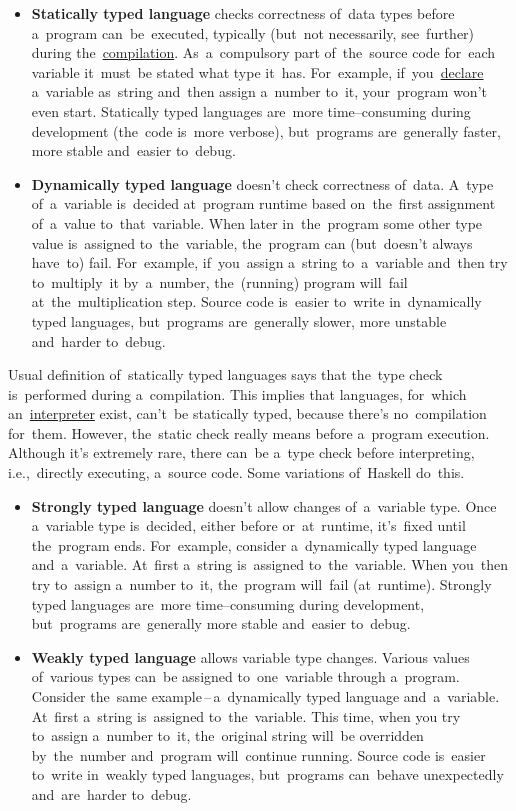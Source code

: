 \begin{itemize}
    \item \textbf{Statically typed language} checks correctness of~data types before a~program can~be~executed, typically (but~not necessarily, see~further) during the~\hyperref[compiledinterpretedlanguages]{compilation}. As~a~compulsory part of~the~source code for~each variable it~must~be stated what type it~has. For~example, if~you~\hyperref[declarationdefinition]{declare} a~variable as~string and~then assign a~number to~it, your~program won't even start. Statically typed languages are~more time--consuming during development (the~code is~more verbose), but~programs are~generally faster, more stable and~easier to~debug.
    \item \textbf{Dynamically typed language} doesn't check correctness of~data. A~type of~a~variable is~decided at~program runtime based on~the~first assignment of~a~value to~that~variable. When later in~the~program some other type value is~assigned to~the~variable, the~program can (but~doesn't always have~to) fail. For~example, if~you~assign a~string to~a~variable and~then try to~multiply~it by~a~number, the~(running) program will~fail at~the~multiplication step. Source code is~easier to~write in~dynamically typed languages, but~programs are~generally slower, more unstable and~harder to~debug.
\end{itemize}

\warning Usual definition of~statically typed languages says that the~type check is~performed during a~compilation. This implies that languages, for~which an~\hyperref[compiledinterpretedlanguages]{interpreter} exist, can't~be statically typed, because there's no~compilation for~them. However, the~static check really means before a~program execution. Although it's extremely rare, there can~be a~type check before interpreting, i.e.,~directly executing, a~source code. Some variations of~Haskell do~this.

\begin{itemize}
    \item \textbf{Strongly typed language} doesn't allow changes of~a~variable type. Once a~variable type is~decided, either before or~at~runtime, it's~fixed until the~program ends. For~example, consider a~dynamically typed language and~a~variable. At~first a~string is~assigned to~the~variable. When you~then try to~assign a~number to~it, the~program will~fail (at~runtime). Strongly typed languages are~more time--consuming during development, but~programs are~generally more stable and~easier to~debug.
    \item \textbf{Weakly typed language} allows variable type changes. Various values of~various types can~be assigned to~one~variable through a~program. Consider the~same example\,--\,a~dynamically typed language and~a~variable. At~first a~string is~assigned to~the~variable. This time, when you try to~assign a~number to~it, the~original string will~be overridden by~the~number and~program will~continue running. Source code is~easier to~write in~weakly typed languages, but~programs can~behave unexpectedly and~are~harder to~debug.
\end{itemize}

